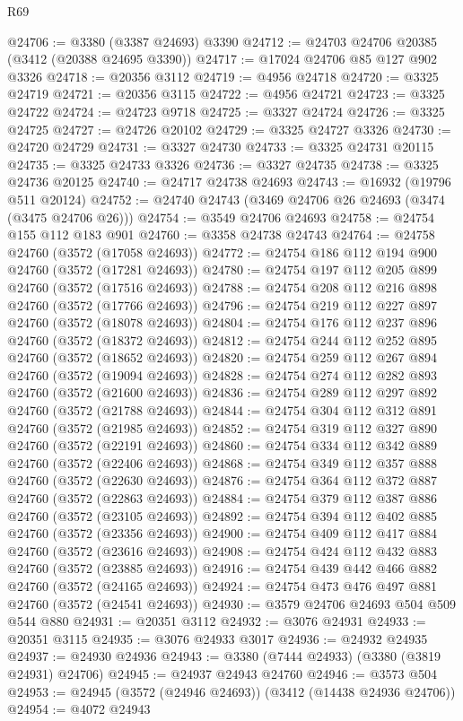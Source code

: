 \begin{lexlean}{R69}
\begin{coremodule}
@24706 := @3380 (@3387 @24693) @3390
@24712 := @24703 @24706 @20385 (@3412 (@20388 @24695 @3390))
@24717 := @17024 @24706 @85 @127 @902 @3326
@24718 := @20356 @3112
@24719 := @4956 @24718
@24720 := @3325 @24719
@24721 := @20356 @3115
@24722 := @4956 @24721
@24723 := @3325 @24722
@24724 := @24723 @9718
@24725 := @3327 @24724
@24726 := @3325 @24725
@24727 := @24726 @20102
@24729 := @3325 @24727 @3326
@24730 := @24720 @24729
@24731 := @3327 @24730
@24733 := @3325 @24731 @20115
@24735 := @3325 @24733 @3326
@24736 := @3327 @24735
@24738 := @3325 @24736 @20125
@24740 := @24717 @24738 @24693
@24743 := @16932 (@19796 @511 @20124)
@24752 := @24740 @24743 (@3469 @24706 @26 @24693 (@3474 (@3475 @24706 @26)))
@24754 := @3549 @24706 @24693
@24758 := @24754 @155 @112 @183 @901
@24760 := @3358 @24738 @24743
@24764 := @24758 @24760 (@3572 (@17058 @24693))
@24772 := @24754 @186 @112 @194 @900 @24760 (@3572 (@17281 @24693))
@24780 := @24754 @197 @112 @205 @899 @24760 (@3572 (@17516 @24693))
@24788 := @24754 @208 @112 @216 @898 @24760 (@3572 (@17766 @24693))
@24796 := @24754 @219 @112 @227 @897 @24760 (@3572 (@18078 @24693))
@24804 := @24754 @176 @112 @237 @896 @24760 (@3572 (@18372 @24693))
@24812 := @24754 @244 @112 @252 @895 @24760 (@3572 (@18652 @24693))
@24820 := @24754 @259 @112 @267 @894 @24760 (@3572 (@19094 @24693))
@24828 := @24754 @274 @112 @282 @893 @24760 (@3572 (@21600 @24693))
@24836 := @24754 @289 @112 @297 @892 @24760 (@3572 (@21788 @24693))
@24844 := @24754 @304 @112 @312 @891 @24760 (@3572 (@21985 @24693))
@24852 := @24754 @319 @112 @327 @890 @24760 (@3572 (@22191 @24693))
@24860 := @24754 @334 @112 @342 @889 @24760 (@3572 (@22406 @24693))
@24868 := @24754 @349 @112 @357 @888 @24760 (@3572 (@22630 @24693))
@24876 := @24754 @364 @112 @372 @887 @24760 (@3572 (@22863 @24693))
@24884 := @24754 @379 @112 @387 @886 @24760 (@3572 (@23105 @24693))
@24892 := @24754 @394 @112 @402 @885 @24760 (@3572 (@23356 @24693))
@24900 := @24754 @409 @112 @417 @884 @24760 (@3572 (@23616 @24693))
@24908 := @24754 @424 @112 @432 @883 @24760 (@3572 (@23885 @24693))
@24916 := @24754 @439 @442 @466 @882 @24760 (@3572 (@24165 @24693))
@24924 := @24754 @473 @476 @497 @881 @24760 (@3572 (@24541 @24693))
@24930 := @3579 @24706 @24693 @504 @509 @544 @880
@24931 := @20351 @3112
@24932 := @3076 @24931
@24933 := @20351 @3115
@24935 := @3076 @24933 @3017
@24936 := @24932 @24935
@24937 := @24930 @24936
@24943 := @3380 (@7444 @24933) (@3380 (@3819 @24931) @24706)
@24945 := @24937 @24943 @24760
@24946 := @3573 @504
@24953 := @24945 (@3572 (@24946 @24693)) (@3412 (@14438 @24936 @24706))
@24954 := @4072 @24943

\end{coremodule}
\end{lexlean}
